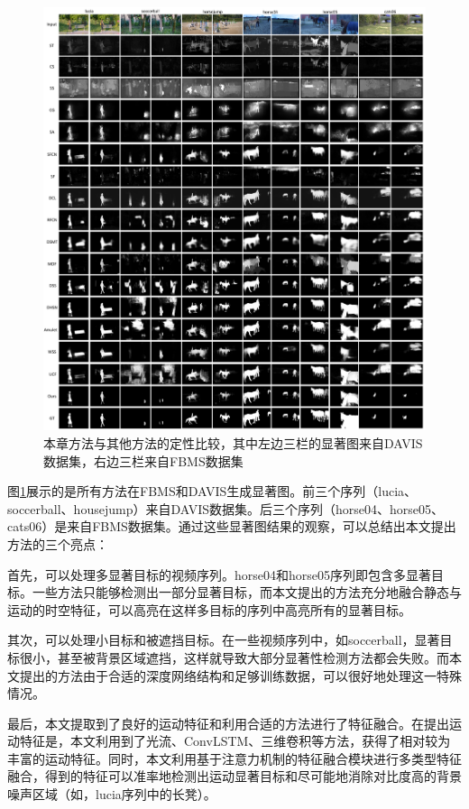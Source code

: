 \begin{figure}
\centering
\includegraphics[width=1\textwidth]{figures/show}
\caption{本章方法与其他方法的定性比较，其中左边三栏的显著图来自DAVIS数据集，右边三栏来自FBMS数据集}
\label{figure5}
\end{figure}

图\ref{figure5}展示的是所有方法在FBMS和DAVIS生成显著图。前三个序列（lucia、soccerball、housejump）来自DAVIS数据集。后三个序列（horse04、horse05、cats06）是来自FBMS数据集。通过这些显著图结果的观察，可以总结出本文提出方法的三个亮点：

首先，可以处理多显著目标的视频序列。horse04和horse05序列即包含多显著目标。一些方法只能够检测出一部分显著目标，而本文提出的方法充分地融合静态与运动的时空特征，可以高亮在这样多目标的序列中高亮所有的显著目标。

其次，可以处理小目标和被遮挡目标。在一些视频序列中，如soccerball，显著目标很小，甚至被背景区域遮挡，这样就导致大部分显著性检测方法都会失败。而本文提出的方法由于合适的深度网络结构和足够训练数据，可以很好地处理这一特殊情况。

最后，本文提取到了良好的运动特征和利用合适的方法进行了特征融合。在提出运动特征是，本文利用到了光流、ConvLSTM、三维卷积等方法，获得了相对较为丰富的运动特征。同时，本文利用基于注意力机制的特征融合模块进行多类型特征融合，得到的特征可以准率地检测出运动显著目标和尽可能地消除对比度高的背景噪声区域（如，lucia序列中的长凳）。
